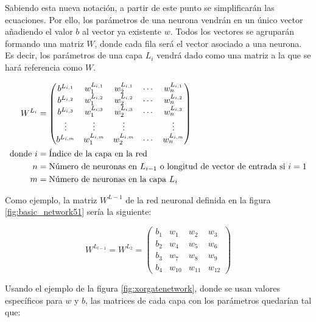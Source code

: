 Sabiendo esta nueva notación, a partir de este punto se simplificarán las ecuaciones. Por ello, los parámetros de una neurona vendrán en un único vector añadiendo el valor $b$ al vector ya existente $w$. Todos los vectores se agruparán formando una matriz $W$, donde cada fila será el vector asociado a una neurona. Es decir, los parámetros de una capa $L_i$ vendrá dado como una matriz a la que se hará referencia como $W$. 

\begin{equation}
\centering
    \begin{split}
    W^{L_i} &= \begin{pmatrix}
  b^{L_{i,1}} & w^{L_{i, 1}}_1 & w^{L_{i, 1}}_2 & \cdots & w^{L_{i, 1}}_n \\
  b^{L_{i,2}} & w^{L_{i, 2}}_1 & w^{L_{i, 2}}_2 & \cdots & w^{L_{i, 2}}_n \\
  b^{L_{i,3}} & w^{L_{i, 3}}_1 & w^{L_{i, 3}}_2 & \cdots & w^{L_{i, 3}}_n \\
  \vdots & \vdots  & \vdots & & \vdots \\
  b^{L_{i,m}} & w^{L_{i, m}}_1 & w^{L_{i, m}}_2 & \cdots & w^{L_{i, m}}_n
  \end{pmatrix} \\ 
    \text{donde}~i &= \text{Índice de la capa en la red} \\
  ~n &= \text{Número de neuronas en }L_{i-1}\text{ o longitud de vector de entrada si } i=1 \\
  ~m &= \text{Número de neuronas en la capa } L_i
  \end{split}
  \label{examplenn51}
\end{equation}

Como ejemplo, la matriz $W^{L-1}$ de la red neuronal definida en la figura \ref{fig:basic_network51} sería la siguiente:

\begin{equation}
  W^{L_{l-1}} = W^{L_2} = \begin{pmatrix}
  b_1 & w_1 & w_2 & w_3 \\
  b_2 & w_4 & w_5 & w_6 \\ 
  b_3 & w_7 & w_8 & w_9 \\ 
  b_4 & w_{10} & w_{11} & w_{12}
  \end{pmatrix} 
  \label{eqn:matrixlayer}
\end{equation}



Usando el ejemplo de la figura \ref{fig:xorgatenetwork}, donde se usan valores específicos para $w$ y $b$, las matrices de cada capa con los parámetros quedarían tal que:

